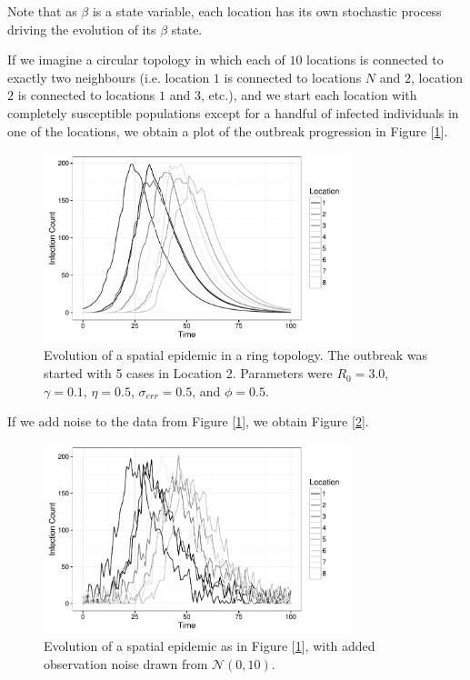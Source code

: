 	Note that as $\beta$ is a state variable, each location has its own stochastic process driving the evolution of its $\beta$ state.

	If we imagine a circular topology in which each of $10$ locations is connected to exactly two neighbours (i.e. location $1$ is connected to locations $N$ and $2$, location $2$ is connected to locations $1$ and $3$, etc.), and we start each location with completely susceptible populations except for a handful of infected individuals in one of the locations, we obtain a plot of the outbreak progression in Figure [\ref{spatialdataplot}].

	\begin{figure}
        \centering
        \captionsetup{width=.8\linewidth}
        \includegraphics[width=0.8\textwidth]{./images/dataplot.pdf}
        \caption{Evolution of a spatial epidemic in a ring topology. The outbreak was started with 5 cases in Location 2. Parameters were $R_0 = 3.0$, $\gamma = 0.1$, $\eta = 0.5$, $\sigma_{err} = 0.5$, and $\phi = 0.5$. \label{spatialdataplot}}
    \end{figure}

    If we add noise to the data from Figure [\ref{spatialdataplot}], we obtain Figure [\ref{spatialdataplot2}].

    \begin{figure}
        \centering
        \captionsetup{width=.8\linewidth}
        \includegraphics[width=0.8\textwidth]{./images/dataplot2.pdf}
        \caption{Evolution of a spatial epidemic as in Figure [\ref{spatialdataplot}], with added observation noise drawn from $\mathcal{N}(0,10)$. \label{spatialdataplot2}}
    \end{figure}



